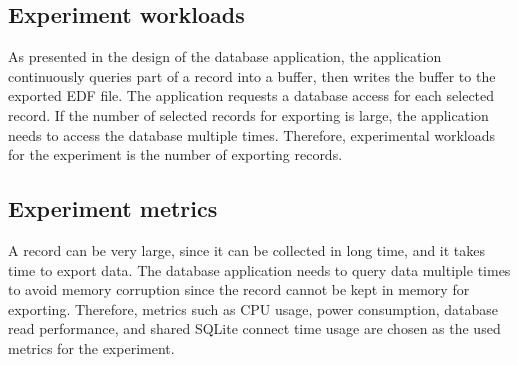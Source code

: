 \subsection{Experiment workloads}
As presented in the design of the database application, the application continuously queries part of a record into a buffer, then writes the buffer to the exported EDF file. The application requests a database access for each selected record. If the number of selected records for exporting is large, the application needs to access the database multiple times. Therefore, experimental workloads for the experiment is the number of exporting records.
\subsection{Experiment metrics}
A record can be very large, since it can be collected in long time, and it takes time to export data. The database application needs to query data multiple times to avoid memory corruption since the record cannot be kept in memory for exporting. Therefore, metrics such as CPU usage, power consumption, database read performance, and shared SQLite connect time usage are chosen as the used metrics for the experiment.
